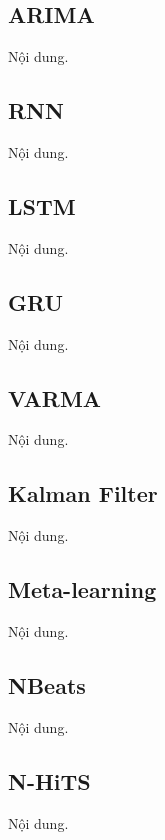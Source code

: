 \subsection{ARIMA}
Nội dung.

\subsection{RNN}
Nội dung. 

\subsection{LSTM}
Nội dung.

\subsection{GRU}
Nội dung.

\subsection{VARMA}
Nội dung. 

\subsection{Kalman Filter}
Nội dung.

\subsection{Meta-learning}
Nội dung.


\subsection{NBeats}
Nội dung.

\subsection{N-HiTS}
Nội dung.